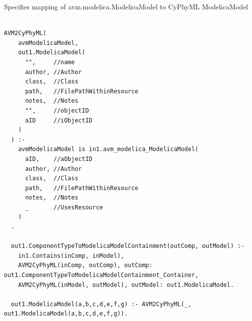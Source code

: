 Specifies mapping of avm.modelica.ModelicaModel to CyPhyML ModelicaModel
\begin{lstlisting}

AVM2CyPhyML(
    avmModelicaModel,
    out1.ModelicaModel(
      "",     //name
      author, //Author
      class,  //Class
      path,   //FilePathWithinResource
      notes,  //Notes
      "",     //objectID
      aID     //iObjectID
    )
  ) :-
    avmModelicaModel is in1.avm_modelica_ModelicaModel(
      aID,    //aObjectID
      author, //Author
      class,  //Class
      path,   //FilePathWithinResource
      notes,  //Notes
      _       //UsesResource
    )
  .

  out1.ComponentTypeToModelicaModelContainment(outComp, outModel) :-
    in1.Contains(inComp, inModel),
    AVM2CyPhyML(inComp, outComp), outComp: out1.ComponentTypeToModelicaModelContainment_Container,
    AVM2CyPhyML(inModel, outModel), outModel: out1.ModelicaModel.

  out1.ModelicaModel(a,b,c,d,e,f,g) :- AVM2CyPhyML(_, out1.ModelicaModel(a,b,c,d,e,f,g)).


\end{lstlisting}

